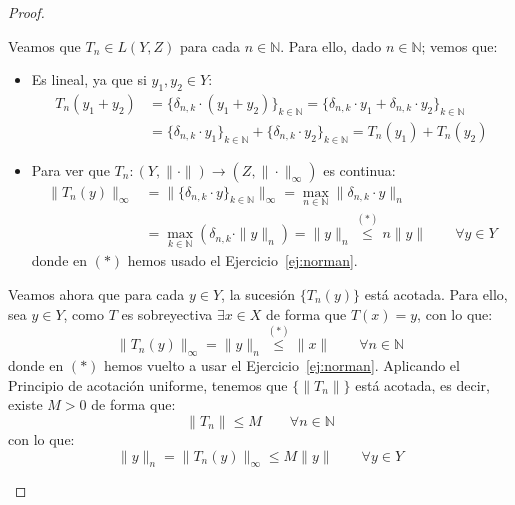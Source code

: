 \begin{teo}
\begin{proof}
\begin{description}
                Veamos que $T_n\in L(Y,Z)$ para cada $n\in \mathbb{N}$. Para ello, dado $n\in \mathbb{N}$; vemos que:
                \begin{itemize}
                    \item Es lineal, ya que si $y_1,y_2\in Y$:
                        \begin{align*}
                            T_n(y_1+y_2) &= \{\delta_{n,k}\cdot (y_1+y_2)\}_{k\in \mathbb{N}} = \{\delta_{n,k}\cdot y_1 + \delta_{n,k}\cdot y_2\}_{k\in \mathbb{N}} \\ &= \{\delta_{n,k}\cdot y_1\}_{k\in \mathbb{N}} + \{\delta_{n,k}\cdot y_2\}_{k\in \mathbb{N}} = T_n(y_1) + T_n(y_2)
                        \end{align*} %
                    \item Para ver que $T_n:(Y,\|\cdot \|)\to (Z,\|\cdot \|_\infty)$ es continua:
                        \begin{align*}
                            \|T_n(y)\|_\infty &= \|\{\delta_{n,k}\cdot y\}_{k\in \mathbb{N}}\|_\infty = \max_{n\in \mathbb{N}}\|\delta_{n,k}\cdot y\|_n \\ &= \max_{k\in \mathbb{N}} (\delta_{n,k}\cdot \|y\|_n) = \|y\|_n \stackrel{(\ast)}{\leq} n\|y\| \qquad  \forall y\in Y
                        \end{align*}
                        donde en $(\ast)$ hemos usado el Ejercicio~\ref{ej:norman}.
                \end{itemize}
                Veamos ahora que para cada $y\in Y$, la sucesión $\{T_n(y)\}$ está acotada. Para ello, sea $y\in Y$, como $T$ es sobreyectiva $\exists x\in X$ de forma que $T(x) = y$, con lo que:
                \begin{equation*}
                    \|T_n(y)\|_\infty = \|y\|_n  \stackrel{(\ast)}{\leq} \|x\| \qquad \forall n\in \mathbb{N}
                \end{equation*}
                donde en $(\ast)$ hemos vuelto a usar el Ejercicio~\ref{ej:norman}. Aplicando el Principio de acotación uniforme, tenemos que $\{\|T_n\|\}$ está acotada, es decir, existe $M>0$ de forma que:
                \begin{equation*}
                    \|T_n\| \leq M \qquad \forall n\in \mathbb{N}
                \end{equation*}
                con lo que:
                \begin{equation*}
                    \|y\|_n = \|T_n(y)\|_\infty \leq M\|y\| \qquad \forall y\in Y

\end{equation*}
\end{description}
\end{proof}
\end{teo}
